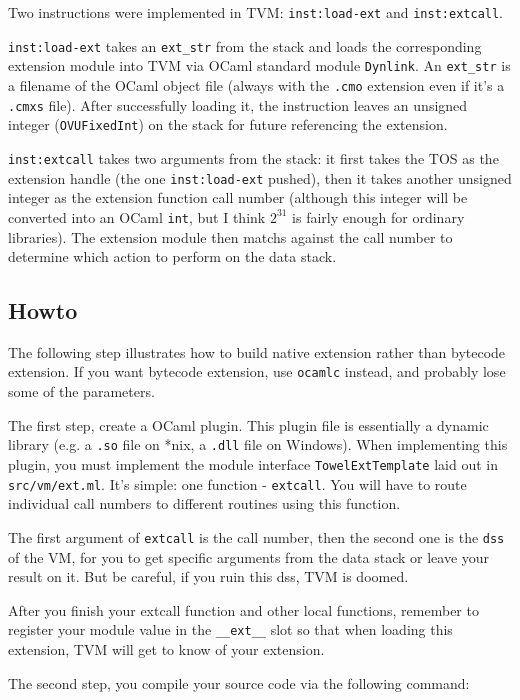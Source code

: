 \documentclass{article}
\newcommand{\inst}[1] {\texttt{inst:#1}}
\begin{document}
Two instructions were implemented in TVM: \inst{load-ext} and \inst{extcall}.

\inst{load-ext} takes an \texttt{ext\_str} from the stack and loads the corresponding extension module into TVM via OCaml standard module \texttt{Dynlink}. An \texttt{ext\_str} is a filename of the OCaml object file (always with the \texttt{.cmo} extension even if it's a \texttt{.cmxs} file). After successfully loading it, the instruction leaves an unsigned integer (\texttt{OVUFixedInt}) on the stack for future referencing the extension.

\inst{extcall} takes two arguments from the stack: it first takes the TOS as the extension handle (the one \inst{load-ext} pushed), then it takes another unsigned integer as the extension function call number (although this integer will be converted into an OCaml \texttt{int}, but I think $2^{31}$ is fairly enough for ordinary libraries). The extension module then matchs against the call number to determine which action to perform on the data stack.

\subsection{Howto}

The following step illustrates how to build native extension rather than bytecode extension. If you want bytecode extension, use \texttt{ocamlc} instead, and probably lose some of the parameters.

The first step, create a OCaml plugin. This plugin file is essentially a dynamic library (e.g. a \texttt{.so} file on *nix, a \texttt{.dll} file on Windows). When implementing this plugin, you must implement the module interface \texttt{TowelExtTemplate} laid out in \texttt{src/vm/ext.ml}. It's simple: one function - \texttt{extcall}. You will have to route individual call numbers to different routines using this function.

The first argument of \texttt{extcall} is the call number, then the second one is the \texttt{dss} of the VM, for you to get specific arguments from the data stack or leave your result on it. But be careful, if you ruin this dss, TVM is doomed.

After you finish your extcall function and other local functions, remember to register your module value in the \texttt{\_\_ext\_\_} slot so that when loading this extension, TVM will get to know of your extension.

The second step, you compile your source code via the following command:\newline
\end{document}
